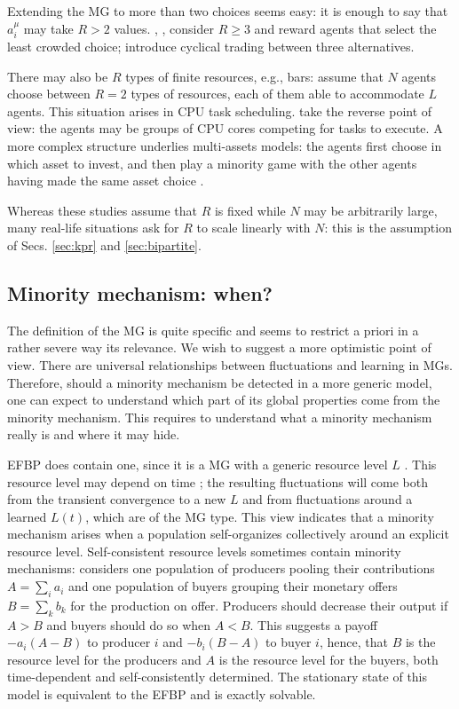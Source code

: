 \documentclass[aps,twocolumn,nofootinbib,sortedaddress,reprint]{revtex4-1}
\begin{document}
Extending the MG to more than two choices seems easy: it is enough to
say that $a_i^\mu$ may take $R>2$
values. \textcite{Kinzel3}, \textcite{chow2003multiplechoiceMG}, \textcite{quan2004evolutionarymultichoiceMG}
consider $R\ge 3$ and reward agents that select the least crowded
choice; \textcite{dhulst1999threesidedMG} introduce cyclical trading
between three alternatives.

There may also be $R$ types of finite resources, e.g., bars:
\textcite{savit2003finiteresources,savit2005generalallocgames} assume
that $N$ agents choose between $R=2$ types of resources, each of them
able to accommodate $L$ agents. This situation arises in CPU task
scheduling.  \textcite{shafique2011minorityCPU} take the reverse point of view: the agents may be groups of CPU cores
competing for tasks to execute. A more
complex structure underlies multi-assets models: the agents first
choose in which asset to invest, and then play a minority game with
the other agents having made the same asset choice
\cite{bianconi2008multiassetsMG}.

Whereas these studies assume that $R$ is fixed while $N$ may be
arbitrarily large, many real-life situations ask for $R$ to scale linearly with
$N$: this is the assumption of Secs. \ref{sec:kpr} and
\ref{sec:bipartite}.

\subsection{Minority mechanism: when?}

The definition of the MG is quite specific and seems to restrict a
priori in a rather severe way its relevance. We wish to suggest a more
optimistic point of view. There are  universal relationships between
fluctuations and learning in MGs. Therefore, should a minority mechanism
be detected in a more generic model, one can expect to understand which part of its global properties come from the minority mechanism. This requires to understand what a minority mechanism really is and where it may hide.

EFBP does contain one, since it is a MG with a generic resource level $L$
\cite{CMO03,JohnsonAsym}. This resource level may depend on time \cite{galstyan2003resource}; the
resulting fluctuations will come both from the transient convergence
to a new $L$ and from fluctuations around a learned $L(t)$, which are
of the MG type. This view indicates that a minority mechanism arises
when a population self-organizes collectively around an explicit
resource level. Self-consistent resource levels sometimes contain minority mechanisms:
 \textcite{C04} considers one population of producers pooling their contributions  $A=\sum_ia_i$ and one population of buyers grouping their monetary offers $B=\sum_k b_k$ for the production on offer. Producers should decrease their output if $A>B$ and buyers should do so when $A<B$. This suggests a payoff $-a_i(A-B)$ to
producer $i$ and $-b_i(B-A)$ to buyer $i$, hence, that $B$ is the resource
level for the producers and $A$ is the resource level for the buyers, both time-dependent and self-consistently determined. The stationary state of this model is equivalent to the EFBP and is exactly solvable.
\end{document}
